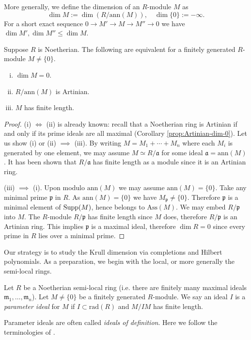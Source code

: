 More generally, we define the dimension of an $R$-module $M$ as
\[ \dim M := \dim(R/\text{ann}(M)), \quad \dim\{0\} := -\infty . \]
For a short exact sequence $0 \to M' \to M \to M'' \to 0$ we have $\dim M', \dim M'' \leq \dim M$.

\begin{lemma}\label{prop:dim-M-equiv}
	Suppose $R$ is Noetherian. The following are equivalent for a finitely generated $R$-module $M \neq \{0\}$.
	\begin{enumerate}[(i)]
		\item $\dim M = 0$.
		\item $R/\mathrm{ann}(M)$ is Artinian.
		\item $M$ has finite length.
	\end{enumerate}
\end{lemma}
\begin{proof}
	(i) $\iff$ (ii) is already known: recall that a Noetherian ring is Artinian if and only if its prime ideals are all maximal (Corollary \ref{prop:Artinian-dim-0}). Let us show (i) or (ii) $\implies$ (iii). By writing $M = M_1 + \cdots + M_n$ where each $M_i$ is generated by one element,  we may assume $M \simeq R/\mathfrak{a}$ for some ideal $\mathfrak{a} = \text{ann}(M)$. It has been shown that $R/\mathfrak{a}$ has finite length as a module since it is an Artinian ring.
	
	(iii) $\implies$ (i). Upon modulo $\text{ann}(M)$ we may assume $\text{ann}(M)=\{0\}$. Take any minimal prime $\mathfrak{p}$ in $R$. As $\text{ann}(M) = \{0\}$ we have $M_{\mathfrak{p}} \neq \{0\}$. Therefore $\mathfrak{p}$ is a minimal element of $\operatorname{Supp}(M)$, hence belongs to $\text{Ass}(M)$. We may embed $R/\mathfrak{p}$ into $M$. The $R$-module $R/\mathfrak{p}$ has finite length since $M$ does, therefore $R/\mathfrak{p}$ is an Artinian ring. This implies $\mathfrak{p}$ is a maximal ideal, therefore $\dim R = 0$ since every prime in $R$ lies over a minimal prime.
\end{proof}

Our strategy is to study the Krull dimension via completions and Hilbert polynomials. As a preparation, we begin with the local, or more generally the semi-local rings.

\begin{definition}
	Let $R$ be a Noetherian semi-local ring (i.e. there are finitely many maximal ideals $\mathfrak{m}_1, \ldots, \mathfrak{m}_n$). Let $M \neq \{0\}$ be a finitely generated $R$-module. We say an ideal $I$ is a \emph{parameter ideal} for $M$ if $I \subset \text{rad}(R)$ and $M/IM$ has finite length.
\end{definition}
Parameter ideals are often called \emph{ideals of definition}. Here we follow the terminologies of \cite{Eis95}.

